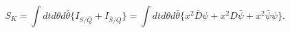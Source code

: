 \begin{equation}\label{S0N2K}
 S_K=\int dtd\theta d\bar{\theta}\{I_{S/\bar Q}+I_{\bar S/Q}\}=
\int dtd\theta d\bar{\theta}\{ x^2\bar D \psi+x^2 D
\bar\psi+x^2\bar\psi\psi\}.
\end{equation}

